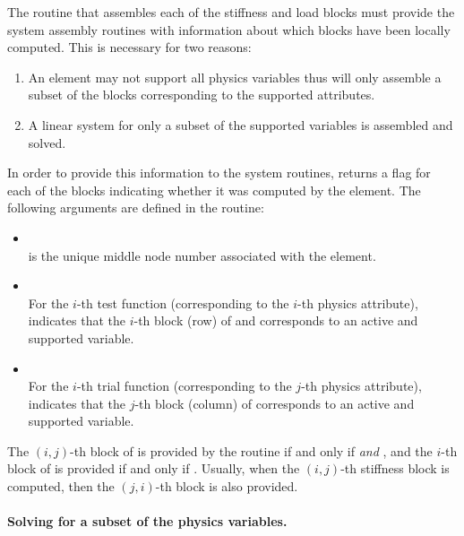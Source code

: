The  routine that assembles each of the stiffness and load blocks must provide the system assembly routines with information about which blocks have been locally computed. This is necessary for two reasons:
\begin{enumerate}
	\item An element may not support all physics variables thus will only assemble a subset of the blocks corresponding to the supported attributes.
	\item A linear system for only a subset of the supported variables is assembled and solved.
\end{enumerate}
In order to provide this information to the system routines,  returns a flag for each of the blocks indicating whether it was computed by the element. The following arguments are defined in the  routine:
\begin{itemize}
	\itemsep 0pt
	\item{  \\
		 is the unique middle node number associated with the element.
	}
	\item{  \\
		For the $i$-th test function (corresponding to the $i$-th physics attribute),  indicates that the $i$-th block (row) of  and  corresponds to an active and supported variable.
	}
	\item{  \\
		For the $i$-th trial function (corresponding to the $j$-th physics attribute),  indicates that the $j$-th block (column) of  corresponds to an active and supported variable.
	}
\end{itemize}

The $(i,j)$-th block of  is provided by the  routine if and only if  \emph{and} , and the $i$-th block of  is provided if and only if . Usually, when the $(i,j)$-th stiffness block is computed, then the $(j,i)$-th block is also provided.

\paragraph{Solving for a subset of the physics variables.}


